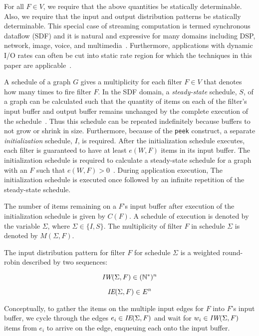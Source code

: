 For all $F \in V$, we require that the above quantities be statically
determinable.  Also, we require that the input and output distribution
patterns be statically determinable.  This special case of streaming
computation is termed synchronous dataflow (SDF) and it is natural and
expressive for many domains including DSP, network, image, voice, and
multimedia~\cite{leeSDF}.  Furthermore, applications with dynamic
I/O rates can often be cut into static rate region for which the
techniques in this paper are applicable~\cite{chen:graphics-hardware:2005}.

A schedule of a graph $G$ gives a multiplicity for each filter $F \in
V$ that denotes how many times to fire filter $F$. In the SDF domain,
a {\it steady-state} schedule, $S$, of a graph can be calculated such
that the quantity of items on each of the filter's input buffer and
output buffer remains unchanged by the complete execution of the
schedule~\cite{lee87}.  Thus this schedule can be repeated
indefinitely because buffers to not grow or shrink in size.
Furthermore, because of the {\tt peek} construct, a separate {\it
initialization} schedule, $I$, is required. After the initialization
schedule executes, each filter is guaranteed to have at least $e(W,
F)$ items in its input buffer. The initialization schedule is required
to calculate a steady-state schedule for a graph with an $F$ such that
$e(W, F) > 0$~\cite{karczmarek:lctes:2003}.  During application
execution, The initialization schedule is executed once followed by an
infinite repetition of the steady-state schedule. 

The number of items remaining on a $F$'s input buffer after execution
of the initialization schedule is given by $C(F)$. A schedule of
execution is denoted by the variable $\Sigma$, where $\Sigma \in
\{I, S\}$.  The multiplicity of filter $F$ in schedule $\Sigma$ is
denoted by $M(\Sigma, F)$.

The input distribution pattern for filter $F$ for schedule $\Sigma$ is
a weighted round-robin described by two sequences:

\[ \mbox{\it IW}(\Sigma, F) \in (\mathbb{N}^{*})^n \]

\[ \mbox{\it IE}(\Sigma, F) \in E^n \]
 
Conceptually, to gather the items on the multiple input edges for $F$
into $F$'s input buffer, we cycle through the edges $e_i \in
\mbox{\it IE}(\Sigma, F)$ and wait for $w_i \in \mbox{\it IW}(\Sigma, F)$ items
from $e_i$ to arrive on the edge, enqueuing each onto the input buffer.

